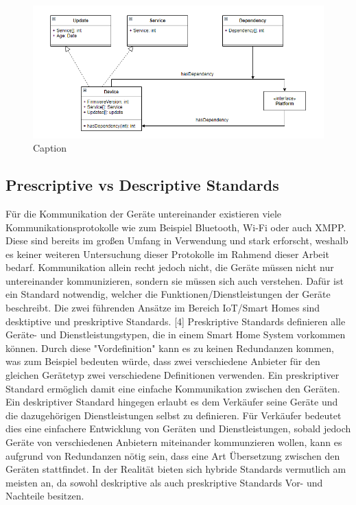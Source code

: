 \begin{figure}[!ht]
\hspace*{-2,5cm}                                                           
\includegraphics{"System Model"}
  \caption{Caption}
  \label{fig:Prob1:MEA}
\end{figure}


\newpage
\subsection{Prescriptive vs Descriptive Standards}
Für die Kommunikation der Geräte untereinander existieren viele Kommunikationsprotokolle wie zum Beispiel Bluetooth,
Wi-Fi oder auch XMPP. Diese sind bereits im großen Umfang in Verwendung und stark erforscht, weshalb es keiner weiteren
Untersuchung dieser Protokolle im Rahmend dieser Arbeit bedarf.
Kommunikation allein recht jedoch nicht, die Geräte müssen nicht nur untereinander kommunizieren, sondern sie müssen sich auch 
verstehen. Dafür ist ein Standard notwendig, welcher die Funktionen/Dienstleistungen der Geräte beschreibt.
Die zwei führenden Ansätze im Bereich IoT/Smart Homes sind desktiptive und preskriptive Standards. [4]
Preskriptive Standards definieren alle Geräte- und Dienstleistungstypen, die in einem Smart Home System vorkommen können.
Durch diese "Vordefinition" kann es zu keinen Redundanzen kommen, was zum Beispiel bedeuten würde, dass zwei verschiedene
Anbieter für den gleichen Gerätetyp zwei verschiedene Definitionen verwenden. Ein preskriptiver Standard ermöglich damit eine 
einfache Kommunikation zwischen den Geräten. 
Ein deskriptiver Standard hingegen erlaubt es dem Verkäufer seine Geräte und die dazugehörigen Dienstleistungen selbst zu definieren.
Für Verkäufer bedeutet dies eine einfachere Entwicklung von Geräten und Dienstleistungen, sobald jedoch Geräte von verschiedenen 
Anbietern miteinander kommunzieren wollen, kann es aufgrund von Redundanzen nötig sein, dass eine Art Übersetzung zwischen den 
Geräten stattfindet.
In der Realität bieten sich hybride Standards vermutlich am meisten an, da sowohl deskriptive als auch preskriptive Standards Vor- und
Nachteile besitzen.   



